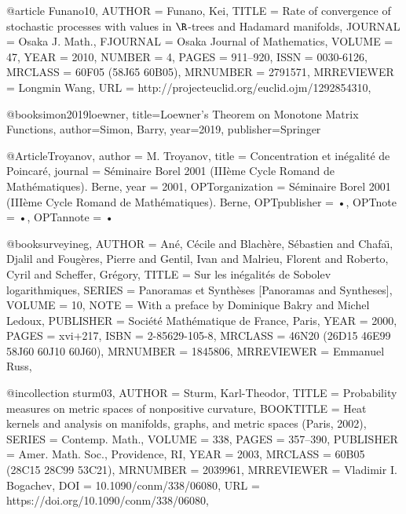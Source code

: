 @article {Funano10,
    AUTHOR = {Funano, Kei},
     TITLE = {Rate of convergence of stochastic processes with values in
              {$\R$}-trees and {H}adamard manifolds},
   JOURNAL = {Osaka J. Math.},
  FJOURNAL = {Osaka Journal of Mathematics},
    VOLUME = {47},
      YEAR = {2010},
    NUMBER = {4},
     PAGES = {911--920},
      ISSN = {0030-6126},
   MRCLASS = {60F05 (58J65 60B05)},
  MRNUMBER = {2791571},
MRREVIEWER = {Longmin Wang},
       URL = {http://projecteuclid.org/euclid.ojm/1292854310},
}

@book{simon2019loewner,
  title={Loewner's Theorem on Monotone Matrix Functions},
  author={Simon, Barry},
  year={2019},
  publisher={Springer}
}

@Article{Troyanov,
author = {M. Troyanov},
title = {Concentration et inégalité de {P}oincaré},
journal = {Séminaire Borel 2001 (IIIème Cycle Romand de Mathématiques).  Berne},
year = {2001},
OPTorganization = {Séminaire Borel 2001 (IIIème Cycle Romand de Mathématiques).  Berne},
OPTpublisher = {•},
OPTnote = {•},
OPTannote = {•}
}



@book{surveyineg,
    AUTHOR = {An\'{e}, C\'{e}cile and Blach\`ere, S\'{e}bastien and Chafa\"{\i}, Djalil and
              Foug\`eres, Pierre and Gentil, Ivan and Malrieu, Florent and
              Roberto, Cyril and Scheffer, Gr\'{e}gory},
     TITLE = {Sur les in\'{e}galit\'{e}s de {S}obolev logarithmiques},
    SERIES = {Panoramas et Synth\`eses [Panoramas and Syntheses]},
    VOLUME = {10},
      NOTE = {With a preface by Dominique Bakry and Michel Ledoux},
 PUBLISHER = {Soci\'{e}t\'{e} Math\'{e}matique de France, Paris},
      YEAR = {2000},
     PAGES = {xvi+217},
      ISBN = {2-85629-105-8},
   MRCLASS = {46N20 (26D15 46E99 58J60 60J10 60J60)},
  MRNUMBER = {1845806},
MRREVIEWER = {Emmanuel Russ},
}


@incollection {sturm03,
    AUTHOR = {Sturm, Karl-Theodor},
     TITLE = {Probability measures on metric spaces of nonpositive
              curvature},
 BOOKTITLE = {Heat kernels and analysis on manifolds, graphs, and metric
              spaces ({P}aris, 2002)},
    SERIES = {Contemp. Math.},
    VOLUME = {338},
     PAGES = {357--390},
 PUBLISHER = {Amer. Math. Soc., Providence, RI},
      YEAR = {2003},
   MRCLASS = {60B05 (28C15 28C99 53C21)},
  MRNUMBER = {2039961},
MRREVIEWER = {Vladimir I. Bogachev},
       DOI = {10.1090/conm/338/06080},
       URL = {https://doi.org/10.1090/conm/338/06080},
}



